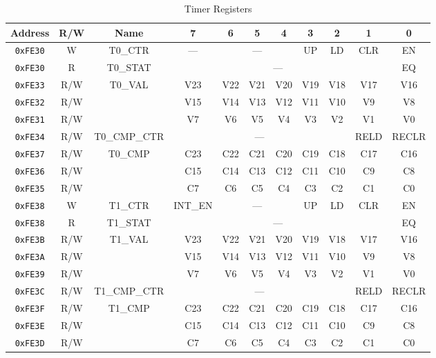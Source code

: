 \begin{table}[ht]
    \begin{center}
        \begin{tabular}{|c|c|c|c|c|c|c|c|c|c|c|} \hline
            Address & R/W & Name & 7 & 6 & 5 & 4 & 3 & 2 & 1 & 0 \\\hline\hline
			\verb+0xFE30+ & W & T0\_CTR & --- & \multicolumn{3}{|c|}{---} & UP & LD & CLR & EN \\ \hline
			\verb+0xFE30+ & R & T0\_STAT & \multicolumn{7}{|c|}{---} & EQ \\ \hline

			\verb+0xFE33+ & R/W & \multirow{3}{*}{T0\_VAL} & V23 & V22 & V21 & V20 & V19 & V18 & V17 & V16 \\ \cline{1-2}\cline{4-11}
			\verb+0xFE32+ & R/W &  & V15 & V14 & V13 & V12 & V11 & V10 & V9 & V8 \\ \cline{1-2}\cline{4-11}
			\verb+0xFE31+ & R/W &  & V7 & V6 & V5 & V4 & V3 & V2 & V1 & V0 \\ \hline

			\verb+0xFE34+ & R/W & T0\_CMP\_CTR & \multicolumn{6}{|c|}{---} & RELD & RECLR \\ \hline

			\verb+0xFE37+ & R/W & \multirow{3}{*}{T0\_CMP} & C23 & C22 & C21 & C20 & C19 & C18 & C17 & C16 \\ \cline{1-2}\cline{4-11}
			\verb+0xFE36+ & R/W &  & C15 & C14 & C13 & C12 & C11 & C10 & C9 & C8 \\ \cline{1-2}\cline{4-11}
			\verb+0xFE35+ & R/W &  & C7 & C6 & C5 & C4 & C3 & C2 & C1 & C0 \\ \hline\hline

			\verb+0xFE38+ & W & T1\_CTR & INT\_EN & \multicolumn{3}{|c|}{---} & UP & LD & CLR & EN \\ \hline
			\verb+0xFE38+ & R & T1\_STAT & \multicolumn{7}{|c|}{---} & EQ \\ \hline

			\verb+0xFE3B+ & R/W & \multirow{3}{*}{T1\_VAL} & V23 & V22 & V21 & V20 & V19 & V18 & V17 & V16 \\ \cline{1-2}\cline{4-11}\hline
			\verb+0xFE3A+ & R/W &  & V15 & V14 & V13 & V12 & V11 & V10 & V9 & V8 \\ \cline{1-2}\cline{4-11}
			\verb+0xFE39+ & R/W &  & V7 & V6 & V5 & V4 & V3 & V2 & V1 & V0 \\ \hline



			\verb+0xFE3C+ & R/W & T1\_CMP\_CTR & \multicolumn{6}{|c|}{---} & RELD & RECLR \\ \hline

			\verb+0xFE3F+ & R/W & \multirow{3}{*}{T1\_CMP} & C23 & C22 & C21 & C20 & C19 & C18 & C17 & C16 \\ \cline{1-2}\cline{4-11}
			\verb+0xFE3E+ & R/W &  & C15 & C14 & C13 & C12 & C11 & C10 & C9 & C8 \\ \cline{1-2}\cline{4-11}
			\verb+0xFE3D+ & R/W &  & C7 & C6 & C5 & C4 & C3 & C2 & C1 & C0 \\ \hline
        \end{tabular}
    \end{center}
    \caption{Timer Registers}
    \label{tab:timer_reg}
\end{table}

